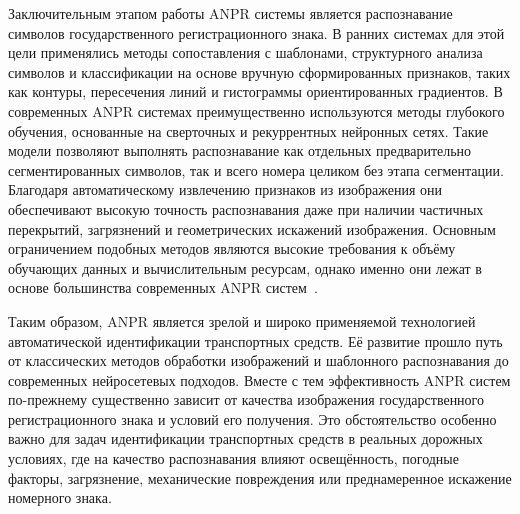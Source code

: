 \documentclass[12pt]{article}
\theoremstyle{definition}
\begin{document}
Заключительным этапом работы ANPR системы является распознавание символов государственного регистрационного знака. В ранних системах для этой цели применялись методы сопоставления с шаблонами, структурного анализа символов и классификации на основе вручную сформированных признаков, таких как контуры, пересечения линий и гистограммы ориентированных градиентов. В современных ANPR системах преимущественно используются методы глубокого обучения, основанные на сверточных и рекуррентных нейронных сетях. Такие модели позволяют выполнять распознавание как отдельных предварительно сегментированных символов, так и всего номера целиком без этапа сегментации. Благодаря автоматическому извлечению признаков из изображения они обеспечивают высокую точность распознавания даже при наличии частичных перекрытий, загрязнений и геометрических искажений изображения. Основным ограничением подобных методов являются высокие требования к объёму обучающих данных и вычислительным ресурсам, однако именно они лежат в основе большинства современных ANPR систем~\cite{9199828, Buleu2025, Agarwal2024, Wang2026}.


Таким образом, ANPR является зрелой и широко применяемой технологией автоматической идентификации транспортных средств. Её развитие прошло путь от классических методов обработки изображений и шаблонного распознавания до современных нейросетевых подходов. Вместе с тем эффективность ANPR систем по-прежнему существенно зависит от качества изображения государственного регистрационного знака и условий его получения. Это обстоятельство особенно важно для задач идентификации транспортных средств в реальных дорожных условиях, где на качество распознавания влияют освещённость, погодные факторы, загрязнение, механические повреждения или преднамеренное искажение номерного знака.
\end{document}
